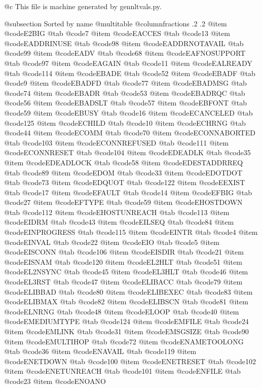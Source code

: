 @c This file is machine generated by gennltvals.py.

@subsection Sorted by name
@multitable @columnfractions .2 .2
@item @code{E2BIG}
@tab @code{7}
@item @code{EACCES}
@tab @code{13}
@item @code{EADDRINUSE}
@tab @code{98}
@item @code{EADDRNOTAVAIL}
@tab @code{99}
@item @code{EADV}
@tab @code{68}
@item @code{EAFNOSUPPORT}
@tab @code{97}
@item @code{EAGAIN}
@tab @code{11}
@item @code{EALREADY}
@tab @code{114}
@item @code{EBADE}
@tab @code{52}
@item @code{EBADF}
@tab @code{9}
@item @code{EBADFD}
@tab @code{77}
@item @code{EBADMSG}
@tab @code{74}
@item @code{EBADR}
@tab @code{53}
@item @code{EBADRQC}
@tab @code{56}
@item @code{EBADSLT}
@tab @code{57}
@item @code{EBFONT}
@tab @code{59}
@item @code{EBUSY}
@tab @code{16}
@item @code{ECANCELED}
@tab @code{125}
@item @code{ECHILD}
@tab @code{10}
@item @code{ECHRNG}
@tab @code{44}
@item @code{ECOMM}
@tab @code{70}
@item @code{ECONNABORTED}
@tab @code{103}
@item @code{ECONNREFUSED}
@tab @code{111}
@item @code{ECONNRESET}
@tab @code{104}
@item @code{EDEADLK}
@tab @code{35}
@item @code{EDEADLOCK}
@tab @code{58}
@item @code{EDESTADDRREQ}
@tab @code{89}
@item @code{EDOM}
@tab @code{33}
@item @code{EDOTDOT}
@tab @code{73}
@item @code{EDQUOT}
@tab @code{122}
@item @code{EEXIST}
@tab @code{17}
@item @code{EFAULT}
@tab @code{14}
@item @code{EFBIG}
@tab @code{27}
@item @code{EFTYPE}
@tab @code{59}
@item @code{EHOSTDOWN}
@tab @code{112}
@item @code{EHOSTUNREACH}
@tab @code{113}
@item @code{EIDRM}
@tab @code{43}
@item @code{EILSEQ}
@tab @code{84}
@item @code{EINPROGRESS}
@tab @code{115}
@item @code{EINTR}
@tab @code{4}
@item @code{EINVAL}
@tab @code{22}
@item @code{EIO}
@tab @code{5}
@item @code{EISCONN}
@tab @code{106}
@item @code{EISDIR}
@tab @code{21}
@item @code{EISNAM}
@tab @code{120}
@item @code{EL2HLT}
@tab @code{51}
@item @code{EL2NSYNC}
@tab @code{45}
@item @code{EL3HLT}
@tab @code{46}
@item @code{EL3RST}
@tab @code{47}
@item @code{ELIBACC}
@tab @code{79}
@item @code{ELIBBAD}
@tab @code{80}
@item @code{ELIBEXEC}
@tab @code{83}
@item @code{ELIBMAX}
@tab @code{82}
@item @code{ELIBSCN}
@tab @code{81}
@item @code{ELNRNG}
@tab @code{48}
@item @code{ELOOP}
@tab @code{40}
@item @code{EMEDIUMTYPE}
@tab @code{124}
@item @code{EMFILE}
@tab @code{24}
@item @code{EMLINK}
@tab @code{31}
@item @code{EMSGSIZE}
@tab @code{90}
@item @code{EMULTIHOP}
@tab @code{72}
@item @code{ENAMETOOLONG}
@tab @code{36}
@item @code{ENAVAIL}
@tab @code{119}
@item @code{ENETDOWN}
@tab @code{100}
@item @code{ENETRESET}
@tab @code{102}
@item @code{ENETUNREACH}
@tab @code{101}
@item @code{ENFILE}
@tab @code{23}
@item @code{ENOANO}
